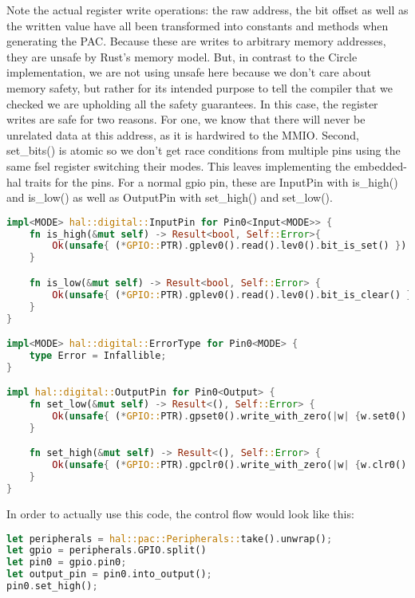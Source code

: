 Note the actual register write operations: the raw address,
the bit offset as well as the written value have all been transformed into constants and methods when generating the PAC.
Because these are writes to arbitrary memory addresses, they are unsafe by Rust's memory model.
But, in contrast to the Circle implementation, we are not using unsafe here because we don't care about memory safety,
but rather for its intended purpose to tell the compiler that we checked we are upholding all the safety guarantees.
In this case, the register writes are safe for two reasons.
For one, we know that there will never be unrelated data at this address, as it is hardwired to the MMIO.
Second, set\_bits() is atomic so we don't get race conditions from multiple pins using the same fsel register switching their modes.
This leaves implementing the embedded-hal traits for the pins. For a normal gpio pin, these are InputPin with is\_high() and is\_low() as well as OutputPin with set\_high() and set\_low().

\begin{lstlisting}[language=Rust,style=colouredRust]
impl<MODE> hal::digital::InputPin for Pin0<Input<MODE>> {
    fn is_high(&mut self) -> Result<bool, Self::Error>{
        Ok(unsafe{ (*GPIO::PTR).gplev0().read().lev0().bit_is_set() })
    }

    fn is_low(&mut self) -> Result<bool, Self::Error> {
        Ok(unsafe{ (*GPIO::PTR).gplev0().read().lev0().bit_is_clear() })
    }
}

impl<MODE> hal::digital::ErrorType for Pin0<MODE> {
    type Error = Infallible;
}

impl hal::digital::OutputPin for Pin0<Output> {
    fn set_low(&mut self) -> Result<(), Self::Error> {
        Ok(unsafe{ (*GPIO::PTR).gpset0().write_with_zero(|w| {w.set0().set_bit()}) })
    }

    fn set_high(&mut self) -> Result<(), Self::Error> {
        Ok(unsafe{ (*GPIO::PTR).gpclr0().write_with_zero(|w| {w.clr0().clear_bit_by_one()}) })
    }
}
\end{lstlisting}

In order to actually use this code, the control flow would look like this:

\begin{lstlisting}[language=Rust,style=colouredRust]
let peripherals = hal::pac::Peripherals::take().unwrap();
let gpio = peripherals.GPIO.split()
let pin0 = gpio.pin0;
let output_pin = pin0.into_output();
pin0.set_high();
\end{lstlisting}

